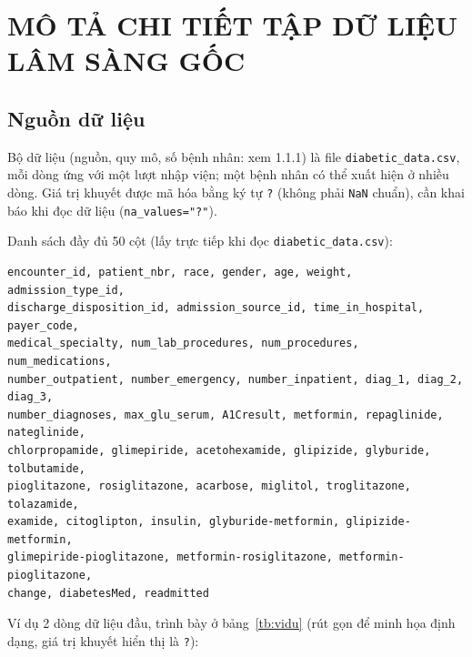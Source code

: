 \documentclass[a4paper]{report}
\begin{document}
\section{MÔ TẢ CHI TIẾT TẬP DỮ LIỆU LÂM SÀNG GỐC}

\subsection{Nguồn dữ liệu}

Bộ dữ liệu (nguồn, quy mô, số bệnh nhân: xem 1.1.1) là file \texttt{diabetic\_\allowbreak{}data.csv}, mỗi dòng ứng với một lượt nhập viện; một bệnh nhân có thể xuất hiện ở nhiều dòng. Giá trị khuyết được mã hóa bằng ký tự \texttt{?} (không phải \texttt{NaN} chuẩn), cần khai báo khi đọc dữ liệu (\texttt{na\_\allowbreak{}values="?"}).

Danh sách đầy đủ 50 cột (lấy trực tiếp khi đọc \texttt{diabetic\_\allowbreak{}data.csv}):

{\scriptsize
\begin{verbatim}
encounter_id, patient_nbr, race, gender, age, weight, admission_type_id,
discharge_disposition_id, admission_source_id, time_in_hospital, payer_code,
medical_specialty, num_lab_procedures, num_procedures, num_medications,
number_outpatient, number_emergency, number_inpatient, diag_1, diag_2, diag_3,
number_diagnoses, max_glu_serum, A1Cresult, metformin, repaglinide, nateglinide,
chlorpropamide, glimepiride, acetohexamide, glipizide, glyburide, tolbutamide,
pioglitazone, rosiglitazone, acarbose, miglitol, troglitazone, tolazamide,
examide, citoglipton, insulin, glyburide-metformin, glipizide-metformin,
glimepiride-pioglitazone, metformin-rosiglitazone, metformin-pioglitazone,
change, diabetesMed, readmitted
\end{verbatim}
}

Ví dụ 2 dòng dữ liệu đầu, trình bày ở bảng~\ref{tb:vidu} (rút gọn để minh họa định dạng, giá trị khuyết hiển thị là \texttt{?}):
\end{document}
